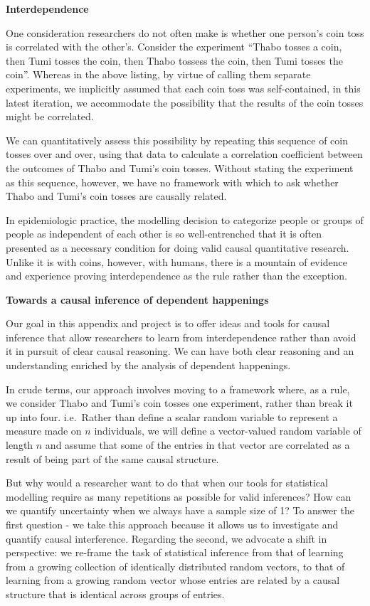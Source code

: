 \documentclass[
  letterpaper,
  DIV=11,
  numbers=noendperiod,
  oneside]{scrreprt}
\begin{document}
\textbf{Interdependence}

One consideration researchers do not often make is whether one person's
coin toss is correlated with the other's. Consider the experiment
``Thabo tosses a coin, then Tumi tosses the coin, then Thabo tossess the
coin, then Tumi tosses the coin''. Whereas in the above listing, by
virtue of calling them separate experiments, we implicitly assumed that
each coin toss was self-contained, in this latest iteration, we
accommodate the possibility that the results of the coin tosses might be
correlated.

We can quantitatively assess this possibility by repeating this sequence
of coin tosses over and over, using that data to calculate a correlation
coefficient between the outcomes of Thabo and Tumi's coin tosses.
Without stating the experiment as this sequence, however, we have no
framework with which to ask whether Thabo and Tumi's coin tosses are
causally related.

In epidemiologic practice, the modelling decision to categorize people
or groups of people as independent of each other is so well-entrenched
that it is often presented as a necessary condition for doing valid
causal quantitative research. Unlike it is with coins, however, with
humans, there is a mountain of evidence and experience proving
interdependence as the rule rather than the exception.

\textbf{Towards a causal inference of dependent happenings}

Our goal in this appendix and project is to offer ideas and tools for
causal inference that allow researchers to learn from interdependence
rather than avoid it in pursuit of clear causal reasoning. We can have
both clear reasoning and an understanding enriched by the analysis of
dependent happenings.

In crude terms, our approach involves moving to a framework where, as a
rule, we consider Thabo and Tumi's coin tosses one experiment, rather
than break it up into four. i.e.~Rather than define a scalar random
variable to represent a measure made on \(n\) individuals, we will
define a vector-valued random variable of length \(n\) and assume that
some of the entries in that vector are correlated as a result of being
part of the same causal structure.

But why would a researcher want to do that when our tools for
statistical modelling require as many repetitions as possible for valid
inferences? How can we quantify uncertainty when we always have a sample
size of 1? To answer the first question - we take this approach because
it allows us to investigate and quantify causal interference. Regarding
the second, we advocate a shift in perspective: we re-frame the task of
statistical inference from that of learning from a growing collection of
identically distributed random vectors, to that of learning from a
growing random vector whose entries are related by a causal structure
that is identical across groups of entries.
\end{document}
